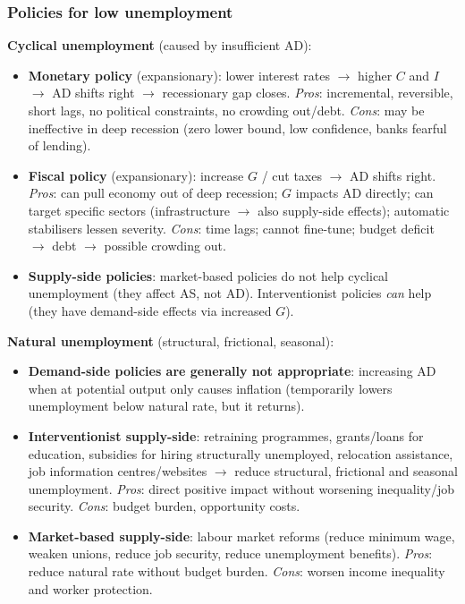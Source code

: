 \subsubsection*{Policies for low unemployment}
\textbf{Cyclical unemployment} (caused by insufficient AD):
\begin{itemize}
  \item \textbf{Monetary policy} (expansionary): lower interest rates $\to$ higher $C$ and $I$ $\to$ AD shifts right $\to$ recessionary gap closes. \textit{Pros}: incremental, reversible, short lags, no political constraints, no crowding out/debt. \textit{Cons}: may be ineffective in deep recession (zero lower bound, low confidence, banks fearful of lending).
  \item \textbf{Fiscal policy} (expansionary): increase $G$ / cut taxes $\to$ AD shifts right. \textit{Pros}: can pull economy out of deep recession; $G$ impacts AD directly; can target specific sectors (infrastructure $\to$ also supply-side effects); automatic stabilisers lessen severity. \textit{Cons}: time lags; cannot fine-tune; budget deficit $\to$ debt $\to$ possible crowding out.
  \item \textbf{Supply-side policies}: market-based policies do not help cyclical unemployment (they affect AS, not AD). Interventionist policies \textit{can} help (they have demand-side effects via increased $G$).
\end{itemize}
\textbf{Natural unemployment} (structural, frictional, seasonal):
\begin{itemize}
  \item \textbf{Demand-side policies are generally not appropriate}: increasing AD when at potential output only causes inflation (temporarily lowers unemployment below natural rate, but it returns).
  \item \textbf{Interventionist supply-side}: retraining programmes, grants/loans for education, subsidies for hiring structurally unemployed, relocation assistance, job information centres/websites $\to$ reduce structural, frictional and seasonal unemployment. \textit{Pros}: direct positive impact without worsening inequality/job security. \textit{Cons}: budget burden, opportunity costs.
  \item \textbf{Market-based supply-side}: labour market reforms (reduce minimum wage, weaken unions, reduce job security, reduce unemployment benefits). \textit{Pros}: reduce natural rate without budget burden. \textit{Cons}: worsen income inequality and worker protection.
\end{itemize}

